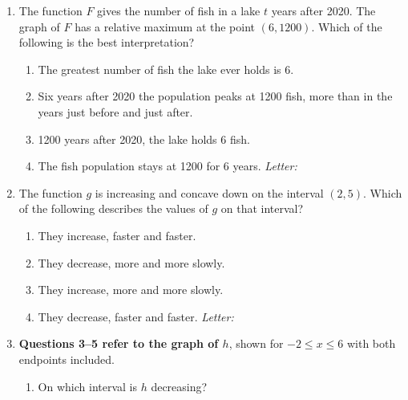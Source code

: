 \documentclass[10pt]{article}
\begin{document}
\begin{enumerate}[leftmargin=1.9em, itemsep=12pt]

\item The function $F$ gives the number of fish in a lake $t$ years after 2020. The graph of
      $F$ has a relative maximum at the point $(6, 1200)$. Which of the following is the best
      interpretation?
      \begin{enumerate}[leftmargin=2.6em, itemsep=2pt]
        \item[(A)] The greatest number of fish the lake ever holds is 6.
        \item[(B)] Six years after 2020 the population peaks at 1200 fish, more than in the years
                   just before and just after.
        \item[(C)] 1200 years after 2020, the lake holds 6 fish.
        \item[(D)] The fish population stays at 1200 for 6 years. \hfill\textit{Letter:}~\gradedblank[id=ap1, type=choice, points=1, answer=B]{0.42in}{13pt}
      \end{enumerate}

\item The function $g$ is increasing and concave down on the interval $(2, 5)$. Which of the
      following describes the values of $g$ on that interval?
      \begin{enumerate}[leftmargin=2.6em, itemsep=2pt]
        \item[(A)] They increase, faster and faster.
        \item[(B)] They decrease, more and more slowly.
        \item[(C)] They increase, more and more slowly.
        \item[(D)] They decrease, faster and faster. \hfill\textit{Letter:}~\gradedblank[id=ap2, type=choice, points=1, answer=C]{0.42in}{13pt}
      \end{enumerate}

\newpage
\item[] \begin{minipage}[t]{0.5\linewidth}
      \textbf{Questions 3--5 refer to the graph of $h$}, shown for $-2 \le x \le 6$ with both
      endpoints included.

      \vspace{8pt}
      \begin{enumerate}[label=\arabic*., leftmargin=1.9em, itemsep=10pt, start=3]
      \item On which interval is $h$ decreasing?


\end{enumerate}
\end{minipage}
\end{enumerate}
\end{document}
